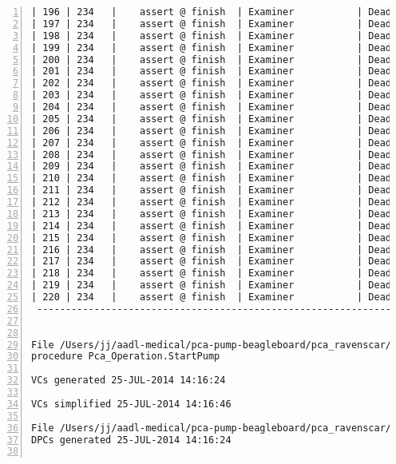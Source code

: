 \begin{lstlisting}[gobble=0, numbers=left, caption={POGS report for PCA Pump prototype}, label={listing:pca_ravenscar:pogs_full}]
| 196 | 234   |    assert @ finish  | Examiner           | Dead      |   ED   |
| 197 | 234   |    assert @ finish  | Examiner           | Dead      |   ED   |
| 198 | 234   |    assert @ finish  | Examiner           | Dead      |   ED   |
| 199 | 234   |    assert @ finish  | Examiner           | Dead      |   ED   |
| 200 | 234   |    assert @ finish  | Examiner           | Dead      |   ED   |
| 201 | 234   |    assert @ finish  | Examiner           | Dead      |   ED   |
| 202 | 234   |    assert @ finish  | Examiner           | Dead      |   ED   |
| 203 | 234   |    assert @ finish  | Examiner           | Dead      |   ED   |
| 204 | 234   |    assert @ finish  | Examiner           | Dead      |   ED   |
| 205 | 234   |    assert @ finish  | Examiner           | Dead      |   ED   |
| 206 | 234   |    assert @ finish  | Examiner           | Dead      |   ED   |
| 207 | 234   |    assert @ finish  | Examiner           | Dead      |   ED   |
| 208 | 234   |    assert @ finish  | Examiner           | Dead      |   ED   |
| 209 | 234   |    assert @ finish  | Examiner           | Dead      |   ED   |
| 210 | 234   |    assert @ finish  | Examiner           | Dead      |   ED   |
| 211 | 234   |    assert @ finish  | Examiner           | Dead      |   ED   |
| 212 | 234   |    assert @ finish  | Examiner           | Dead      |   ED   |
| 213 | 234   |    assert @ finish  | Examiner           | Dead      |   ED   |
| 214 | 234   |    assert @ finish  | Examiner           | Dead      |   ED   |
| 215 | 234   |    assert @ finish  | Examiner           | Dead      |   ED   |
| 216 | 234   |    assert @ finish  | Examiner           | Dead      |   ED   |
| 217 | 234   |    assert @ finish  | Examiner           | Dead      |   ED   |
| 218 | 234   |    assert @ finish  | Examiner           | Dead      |   ED   |
| 219 | 234   |    assert @ finish  | Examiner           | Dead      |   ED   |
| 220 | 234   |    assert @ finish  | Examiner           | Dead      |   ED   |
 -----------------------------------------------------------------------------


File /Users/jj/aadl-medical/pca-pump-beagleboard/pca_ravenscar/pca_operation/startpump.vcg
procedure Pca_Operation.StartPump

VCs generated 25-JUL-2014 14:16:24

VCs simplified 25-JUL-2014 14:16:46

File /Users/jj/aadl-medical/pca-pump-beagleboard/pca_ravenscar/pca_operation/startpump.dpc
DPCs generated 25-JUL-2014 14:16:24


\end{lstlisting}
